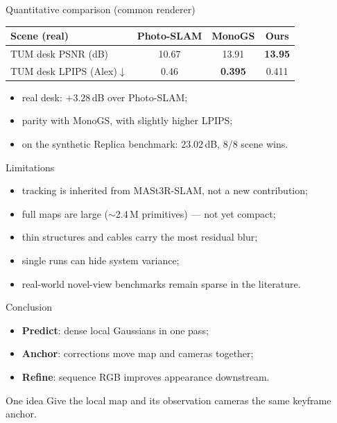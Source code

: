 \documentclass[aspectratio=169,11pt]{beamer}
\begin{document}
\begin{frame}{Quantitative comparison (common renderer)}
  \small
  \begin{center}
  \begin{tabular}{@{}lccc@{}}
    \toprule
    Scene (real) & Photo-SLAM & MonoGS & \textbf{Ours}\\
    \midrule
    TUM desk PSNR (dB)        & 10.67 & 13.91 & \textbf{13.95}\\
    TUM desk LPIPS (Alex)$\downarrow$ & 0.46 & \textbf{0.395} & 0.411\\
    \bottomrule
  \end{tabular}
  \end{center}
  \vspace{4pt}
  \begin{itemize}\small
    \item real desk: \alert{$+3.28$\,dB over Photo-SLAM};
    \item parity with MonoGS, with slightly higher LPIPS;
    \item on the synthetic Replica benchmark: $23.02$\,dB, 8/8 scene wins.
  \end{itemize}
\end{frame}

\begin{frame}{Limitations}
  \begin{itemize}
    \item tracking is inherited from MASt3R-SLAM, not a new contribution;
    \item full maps are large ($\sim$2.4\,M primitives) --- not yet compact;
    \item thin structures and cables carry the most residual blur;
    \item single runs can hide system variance;
    \item real-world novel-view benchmarks remain sparse in the literature.
  \end{itemize}
\end{frame}

\begin{frame}{Conclusion}
  \large
  \begin{itemize}
    \item[\color{teal}$\blacktriangleright$] \textbf{Predict}: dense local Gaussians in one pass;
    \item[\color{amber}$\blacktriangleright$] \textbf{Anchor}: corrections move map and cameras together;
    \item[\color{sblue}$\blacktriangleright$] \textbf{Refine}: sequence RGB improves appearance downstream.
  \end{itemize}
  \normalsize
  \vspace{6pt}
  \begin{block}{One idea}
    Give the local map and its observation cameras the same keyframe anchor.
  \end{block}
\end{frame}
\end{document}
